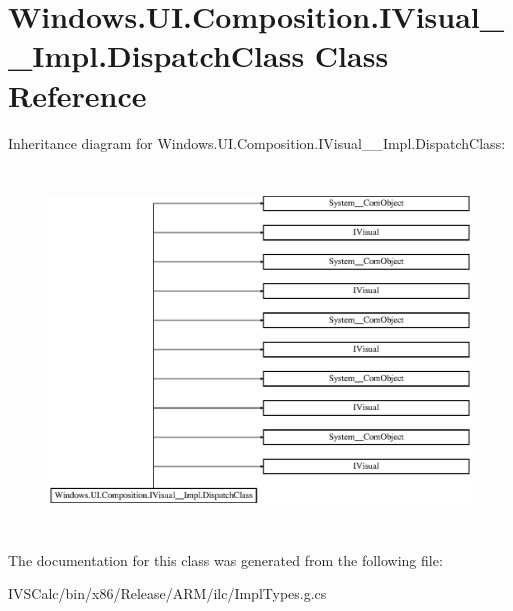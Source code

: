 \hypertarget{class_windows_1_1_u_i_1_1_composition_1_1_i_visual_____impl_1_1_dispatch_class}{}\section{Windows.\+U\+I.\+Composition.\+I\+Visual\+\_\+\+\_\+\+Impl.\+Dispatch\+Class Class Reference}
\label{class_windows_1_1_u_i_1_1_composition_1_1_i_visual_____impl_1_1_dispatch_class}
Inheritance diagram for Windows.\+U\+I.\+Composition.\+I\+Visual\+\_\+\+\_\+\+Impl.\+Dispatch\+Class\+:\begin{figure}[H]
\begin{center}
\leavevmode
\includegraphics[height=9.655172cm]{class_windows_1_1_u_i_1_1_composition_1_1_i_visual_____impl_1_1_dispatch_class}
\end{center}
\end{figure}


The documentation for this class was generated from the following file\+:\begin{DoxyCompactItemize}
\item 
I\+V\+S\+Calc/bin/x86/\+Release/\+A\+R\+M/ilc/Impl\+Types.\+g.\+cs\end{DoxyCompactItemize}
